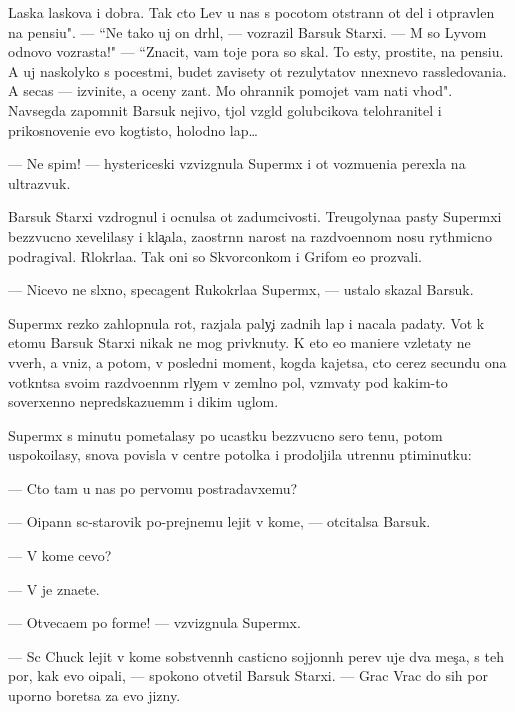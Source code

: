 \documentclass[12pt]{book}
\begin{document}
Laska laskova i dobra. Tak cto Lev u nas s pocotom otstran{\e}n ot del i otpravlen na pensi{\y}u". — ``Ne tako{\y} uj on dr{\ia}hl{\yi}{\y}, — vozrazil Barsuk Starxi{\y}. — M{\yi} so Lyvom odnovo vozrasta!" — ``Znacit, vam toje pora so skal{\yi}. To {\y}esty, prostite, na pensi{\y}u. A uj naskolyko s pocest{\ia}mi, budet zavisety ot rezulytatov n{\yi}nexnevo rassledovani{\y}a. A se{\y}cas — izvinite, {\y}a oceny zan{\ia}t. Mo{\y} ohrannik pomojet vam na{\y}ti v{\yi}hod". Navsegda zapomnit Barsuk nejivo{\y}, t{\ia}jol{\yi}{\y} vzgl{\ia}d golubcikova telohranitel{\ia} i prikosnoveni{\y}e {\y}evo kogtisto{\y}, holodno{\y} lap{\yi}…

— Ne spim! — hystericeski vzvizgnula Superm{\yi}x i ot vozmu{\x}eni{\y}a perexla na ultrazvuk.

Barsuk Starxi{\y} vzdrognul i ocnulsa ot zadumcivosti. Treugolyna{\y}a pasty Superm{\yi}xi bezzvucno xevelilasy i kla{\c}ala, zaostr{\e}nn{\yi}{\y} narost na razdvo{\y}ennom nosu rythmicno podragival. R{\yi}lokr{\yi}la{\y}a. Tak oni so Skvorconkom i Grifom {\y}e{\y}o prozvali.

— Nicevo ne sl{\yi}xno, specagent Rukokr{\yi}la{\y}a Superm{\yi}x, — ustalo skazal Barsuk.

Superm{\yi}x rezko zahlopnula rot, razjala paly{\c}i zadnih lap i nacala padaty. Vot k etomu Barsuk Starxi{\y} nikak ne mog priv{\yi}knuty. K eto{\y} {\y}e{\y}o maniere vzletaty ne vverh, a vniz, a potom, v posledni{\y} moment, kogda kajetsa, cto cerez secundu ona votkn{\e}tsa svo{\y}im razdvo{\y}enn{\yi}m r{\yi}ly{\c}em v zeml{\ia}no{\y} pol, vzm{\yi}vaty pod kakim-to soverxenno nepredskazu{\y}em{\yi}m i dikim uglom.

Superm{\yi}x s minutu pometalasy po ucastku bezzvucno{\y} sero{\y} ten{\y}u, potom uspoko{\y}ilasy, snova povisla v centre potolka i prodoljila utrenn{\io}{\y}u p{\ia}timinutku:

— Cto tam u nas po pervomu postradavxemu?

— O{\x}ipann{\yi}{\y} s{\yi}c-star{\y}ov{\x}ik po-prejnemu lejit v kome, — otcitalsa Barsuk.

— V kome cevo?

— V{\yi} je zna{\y}ete.

— Otveca{\y}em po forme! — vzvizgnula Superm{\yi}x.

— S{\yi}c Chuck lejit v kome sobstvenn{\yi}h casticno sojjonn{\yi}h per{\y}ev uje dva mes{\ia}{\c}a, s teh por, kak {\y}evo o{\x}ipali, — spoko{\y}no otvetil Barsuk Starxi{\y}. — Grac Vrac do sih por uporno boretsa za {\y}evo jizny.
\end{document}
